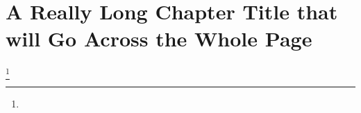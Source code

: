 \documentclass{tufte-book}
\begin{document}
\mainmatter

\chapter{A Really Long Chapter Title that will Go Across the Whole Page}

\lipsum[1]\footnote{\lipsum[1]}
\lipsum[1]
\end{document}
